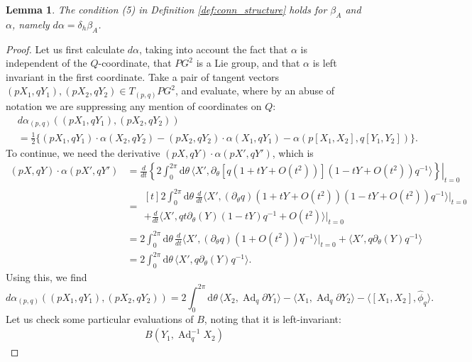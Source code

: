\documentclass[12pt]{amsart}
\DeclareMathOperator{\Ad}{Ad}
\theoremstyle{plain}
\newtheorem{lemma}[theorem]{Lemma}
\theoremstyle{definition}
\theoremstyle{remark}
\numberwithin{equation}{section}
\newcommand{\<}{\langle}
\renewcommand{\>}{\rangle}
\newcommand{\intSone}{\int_{0}^{2\pi}\mathrm{d}\theta\,}
\newcommand{\phihat}{\widehat{\phi}}
\begin{document}
\begin{lemma}\label{lemma:rigid_conn_str_2}
The condition (5) in Definition \ref{def:conn_structure} holds for $\beta_A$ and $\alpha$, namely $d\alpha = \delta_h\beta_A$.
\end{lemma}

\begin{proof}
Let us first calculate $d\alpha$, taking into account the fact that $\alpha$ is independent of the $Q$-coordinate, that $PG^2$ is a Lie group, and that $\alpha$ is left invariant in the first coordinate.
Take a pair of tangent vectors $(pX_1,qY_1),(pX_2,qY_2) \in T_{(p,q)}PG^2$, and evaluate, where by an abuse of notation we are suppressing any mention of coordinates on $Q$:
\begin{align*}
&d\alpha_{(p,q)}\left((pX_1,qY_1),(pX_2,qY_2)\right) \\
& = \tfrac12 \Big\{
(pX_1,qY_1)\cdot \alpha(X_2,qY_2) - (pX_2,qY_2)\cdot \alpha(X_1,qY_1) 
- \alpha(p[X_1,X_2],q[Y_1,Y_2])
\Big\}.
\end{align*}
To continue, we need the derivative $(pX,qY)\cdot \alpha(pX',qY')$, which is
\begin{align*}
(pX,qY)\cdot \alpha(pX',qY') &=
\left.\frac{d}{dt} \left\{ 2\intSone \langle X',\partial_\theta[q(1+tY+O(t^2))](1-tY+O(t^2))q^{-1}\rangle\right\}\right|_{t=0}\\
& = \begin{multlined}[t]
2\intSone  \frac{d}{dt}\langle X',(\partial_\theta q)(1+tY+O(t^2))(1-tY+O(t^2))q^{-1}\rangle\big|_{t=0} \\
+
 \frac{d}{dt}\langle X',qt\partial_\theta(Y)(1-tY)q^{-1}+O(t^2)\rangle\big|_{t=0}  
\end{multlined}\\
& = 2\intSone  \frac{d}{dt}\langle X',(\partial_\theta q)(1+O(t^2))q^{-1}\rangle\big|_{t=0} 
+\langle X',q\partial_\theta(Y)q^{-1}\rangle \\
& = 2\intSone  \langle X',q\partial_\theta(Y)q^{-1}\rangle.
\end{align*}
Using this, we find
\[
d\alpha_{(p,q)}\left((pX_1,qY_1),(pX_2,qY_2)\right)=
2\intSone \langle X_2,\Ad_q\partial Y_1\rangle - \langle X_1 ,\Ad_q \partial Y_2\rangle - \langle [X_1,X_2],\phihat_q\rangle.
\]
Let us check some particular evaluations of $B$, noting that it is left-invariant:
\begin{align*}
  B(Y_1,\Ad_q^{-1}X_2) 

\end{align*}
\end{proof}
\end{document}
